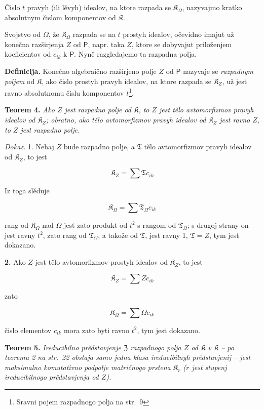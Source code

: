\documentclass[11pt]{article}
\newcommand{\srcfn}[2]{\footnote{#2}}
\begin{document}
Čislo \(t\) pravyh (ili lěvyh) idealov, na ktore razpada se \(\mathfrak K_\Omega\), nazyvajmo kratko absolutnym čislom komponentov od \(\mathfrak K\).

Svojstvo od \(\Omega\), že \(\mathfrak K_\Omega\) razpada se na \(t\) prostyh idealov, očevidno imajut už konečna razširjenja \(Z\) od \(\mathsf P\), napr. taka \(Z\), ktore se dobyvajut priloženjem koeficientov od \(c_{ik}\) k \(\mathsf P\). Nyně razgledajemo ta razpadna polja.

\textbf{Definicija.} Konečno algebraično razširjeno polje \(Z\) od \(\mathsf P\) nazyvaje se \emph{razpadnym poljem} od \(\mathfrak K\), ako čislo prostyh pravyh idealov, na ktore razpada se \(\mathfrak K_Z\), už jest ravno absolutnomu čislu komponentov \(t\)\srcfn{1}{Sravni pojem razpadnogo polja na str.~9}.

\textbf{Teorem 4.} \emph{Ako \(Z\) jest razpadno polje od \(\mathfrak K\), to \(Z\) jest tělo avtomorfizmov pravyh idealov od \(\mathfrak K_Z\); obratno, ako tělo avtomorfizmov pravyh idealov od \(\mathfrak K_Z\) jest ravno \(Z\), to \(Z\) jest razpadno polje.}

\emph{Dokaz.} 1. Nehaj \(Z\) bude razpadno polje, a \(\mathfrak T\) tělo avtomorfizmov pravyh idealov od \(\mathfrak K_Z\), to jest

\[
\mathfrak K_Z=\sum\mathfrak T c_{ik}
\]

Iz toga slěduje

\[
\mathfrak K_\Omega=\sum\mathfrak T_\Omega c_{ik}
\]

rang od \(\mathfrak K_\Omega\) nad \(\Omega\) jest zato produkt od \(t^2\) s rangom od \(\mathfrak T_\Omega\); s drugoj strany on jest ravny \(t^2\), zato rang od \(\mathfrak T_\Omega\), a takože od \(\mathfrak T\), jest ravny 1, \(\mathfrak T=Z\), tym jest dokazano.

\textbf{2.} Ako \(Z\) jest tělo avtomorfizmov prostyh idealov od \(\mathfrak K_Z\), to jest

\[
\mathfrak K_Z=\sum Zc_{ik}
\]

zato

\[
\mathfrak K_\Omega=\sum\Omega c_{ik}
\]

čislo elementov \(c_{ik}\) mora zato byti ravno \(t^2\), tym jest dokazano.

\textbf{Teorem 5.} \emph{Ireducibilno prědstavjenje \(\mathfrak Z\) razpadnogo polja \(Z\) od \(\mathfrak K\) v \(\mathfrak K\) -- po teoremu 2 na str.~22 obstaja samo jedna klasa ireducibilnyh prědstavjenij -- jest maksimalno komutativno podpolje matričnogo prstena \(\mathfrak K_r\) (\(r\) jest stupenj ireducibilnogo prědstavjenja od \(Z\)).}
\end{document}
